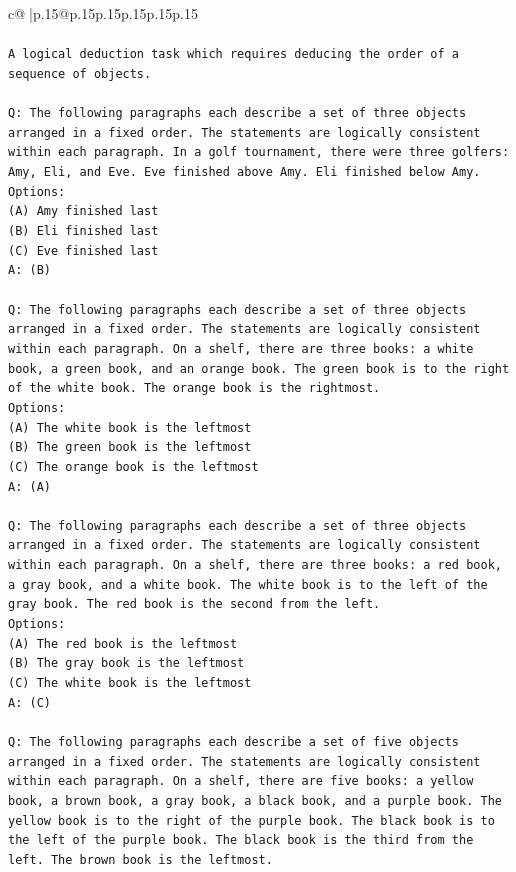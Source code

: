 \documentclass{article}
\begin{document}
{\begin{supertabular}{c@{$\;$}|p{.15\linewidth}@{}p{.15\linewidth}p{.15\linewidth}p{.15\linewidth}p{.15\linewidth}p{.15\linewidth}}
{{{\\ 
\\ 
\texttt{A logical deduction task which requires deducing the order of a sequence of objects.} \\
\\ 
\texttt{Q: The following paragraphs each describe a set of three objects arranged in a fixed order. The statements are logically consistent within each paragraph. In a golf tournament, there were three golfers: Amy, Eli, and Eve. Eve finished above Amy. Eli finished below Amy.} \\
\texttt{Options:} \\
\texttt{(A) Amy finished last} \\
\texttt{(B) Eli finished last} \\
\texttt{(C) Eve finished last} \\
\texttt{A: (B)} \\
\\ 
\texttt{Q: The following paragraphs each describe a set of three objects arranged in a fixed order. The statements are logically consistent within each paragraph. On a shelf, there are three books: a white book, a green book, and an orange book. The green book is to the right of the white book. The orange book is the rightmost.} \\
\texttt{Options:} \\
\texttt{(A) The white book is the leftmost} \\
\texttt{(B) The green book is the leftmost} \\
\texttt{(C) The orange book is the leftmost} \\
\texttt{A: (A)} \\
\\ 
\texttt{Q: The following paragraphs each describe a set of three objects arranged in a fixed order. The statements are logically consistent within each paragraph. On a shelf, there are three books: a red book, a gray book, and a white book. The white book is to the left of the gray book. The red book is the second from the left.} \\
\texttt{Options:} \\
\texttt{(A) The red book is the leftmost} \\
\texttt{(B) The gray book is the leftmost} \\
\texttt{(C) The white book is the leftmost} \\
\texttt{A: (C)} \\
\\ 
\texttt{Q: The following paragraphs each describe a set of five objects arranged in a fixed order. The statements are logically consistent within each paragraph. On a shelf, there are five books: a yellow book, a brown book, a gray book, a black book, and a purple book. The yellow book is to the right of the purple book. The black book is to the left of the purple book. The black book is the third from the left. The brown book is the leftmost.} \\
}}}
\end{supertabular}}
\end{document}
